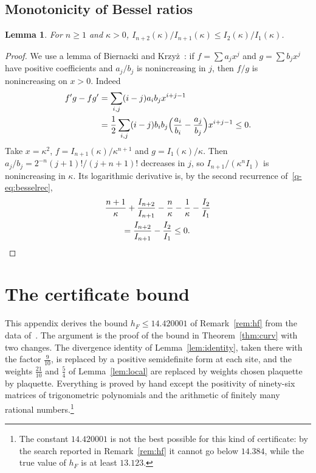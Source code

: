 \documentclass[11pt]{amsart}
\newtheorem{lemma}[theorem]{Lemma}
\theoremstyle{definition}
\theoremstyle{remark}
\numberwithin{equation}{section}
\begin{document}
\subsection{Monotonicity of Bessel ratios}

\begin{lemma}\label{q-lem:ratio}
For $n\ge1$ and $\kappa>0$, $I_{n+2}(\kappa)/I_{n+1}(\kappa)\le I_2(\kappa)/
I_1(\kappa)$.
\end{lemma}

\begin{proof}
We use a lemma of Biernacki and Krzy\.z~\cite{BK55}: if $f=\sum a_jx^j$ and
$g=\sum b_jx^j$ have positive coefficients and $a_j/b_j$ is nonincreasing in
$j$, then $f/g$ is nonincreasing on $x>0$. Indeed
\[
\begin{aligned}
f'g-fg'&=\sum_{i,j}(i-j)a_ib_jx^{i+j-1}\\
&=\frac12\sum_{i,j}(i-j)b_ib_j\Bigl(\frac{a_i}{b_i}-\frac{a_j}{b_j}\Bigr)
x^{i+j-1}\le0 .
\end{aligned}
\]
Take $x=\kappa^2$, $f=I_{n+1}(\kappa)/\kappa^{n+1}$ and $g=I_1(\kappa)/\kappa$.
Then $a_j/b_j=2^{-n}(j+1)!/(j+n+1)!$ decreases in $j$, so $I_{n+1}/(\kappa^n
I_1)$ is nonincreasing in $\kappa$. Its logarithmic derivative is, by the
second recurrence of~\eqref{q-eq:besselrec},
\[
\begin{aligned}
&\frac{n+1}\kappa+\frac{I_{n+2}}{I_{n+1}}-\frac n\kappa-\frac1\kappa-\frac{I_2}
{I_1}\\
&\qquad=\frac{I_{n+2}}{I_{n+1}}-\frac{I_2}{I_1}\le0 .
\end{aligned}\qedhere
\]
\end{proof}

\section{The certificate bound}\label{app:certificate}

This appendix derives the bound $h_F\le14.420001$ of Remark~\ref{rem:hf}
from the data of~\cite{Rom26}. The argument is the proof of the bound in
Theorem~\ref{thm:curv} with two changes. The divergence identity of
Lemma~\ref{lem:identity}, taken there with the factor $\frac9{10}$, is
replaced by a positive semidefinite form at each site, and the weights
$\frac{21}{10}$ and $\frac54$ of Lemma~\ref{lem:local} are replaced by
weights chosen plaquette by plaquette. Everything is proved by hand except
the positivity of ninety-six matrices of trigonometric polynomials and the
arithmetic of finitely many rational numbers.\footnote{The constant
$14.420001$ is not the best possible for this kind of certificate: by the
search reported in Remark~\ref{rem:hf} it cannot go below $14.384$, while
the true value of $h_F$ is at least $13.123$.}
\end{document}
